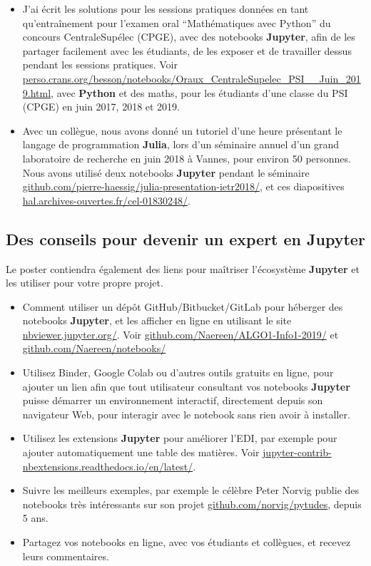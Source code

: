 \documentclass[runningheads]{llncs}
\newcommand{\Jupyter}{\textbf{Jupyter}}
\begin{document}
\begin{itemize}
    \item
    J'ai écrit les solutions pour les sessions pratiques données en tant qu'entraînement pour l'examen oral ``Mathématiques avec Python'' du concours CentraleSupélec (CPGE), avec des notebooks \Jupyter, afin de les partager facilement avec les étudiants, de les exposer et de travailler dessus pendant les sessions pratiques.
    Voir \url{perso.crans.org/besson/notebooks/Oraux_CentraleSupelec_PSI__Juin_2019.html},
    avec \textbf{Python} et des maths,
    pour les étudiants d'une classe du PSI (CPGE) en juin 2017, 2018 et 2019.

    \item
    Avec un collègue, nous avons donné un tutoriel d'une heure présentant le langage de programmation \textbf{Julia}, lors d'un séminaire annuel d'un grand laboratoire de recherche en juin 2018 à Vannes, pour environ 50 personnes.
    Nous avons utilisé deux notebooks \Jupyter{} pendant le séminaire \url{github.com/pierre-haessig/julia-presentation-ietr2018/},
    et ces diapositives \url{hal.archives-ouvertes.fr/cel-01830248/}.

\end{itemize}


\subsection*{Des conseils pour devenir un expert en \Jupyter}

Le poster contiendra également des liens pour maîtriser l'écosystème \Jupyter{} et les utiliser pour votre propre projet.

\begin{itemize}
    \item Comment utiliser un dépôt GitHub/Bitbucket/GitLab pour héberger des notebooks \Jupyter{}, et les afficher en ligne en utilisant le site \url{nbviewer.jupyter.org/}.
    Voir \url{github.com/Naereen/ALGO1-Info1-2019/} et \url{github.com/Naereen/notebooks/}
    \item Utilisez Binder, Google Colab ou d'autres outils gratuits en ligne, pour ajouter un lien afin que tout utilisateur consultant vos notebooks \Jupyter{} puisse démarrer un environnement interactif, directement depuis son navigateur Web, pour interagir avec le notebook sans rien avoir à installer.
    \item Utilisez les extensions \Jupyter{} pour améliorer l'EDI, par exemple pour ajouter automatiquement une table des matières. Voir \url{jupyter-contrib-nbextensions.readthedocs.io/en/latest/}.
    \item Suivre les meilleurs exemples, par exemple le célèbre Peter Norvig publie des notebooks très intéressants sur son projet \url{github.com/norvig/pytudes}, depuis 5 ans.
    \item Partagez vos notebooks en ligne, avec vos étudiants et collègues, et recevez leurs commentaires.
\end{itemize}
\end{document}
